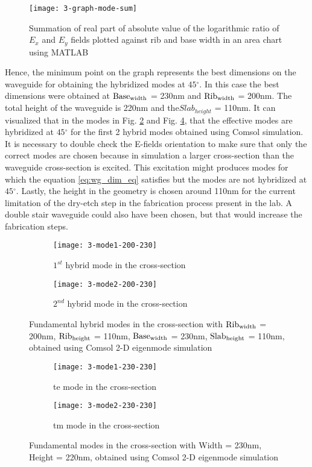 \documentclass[../report.tex]{subfiles}
\begin{document}
\begin{figure}[H] %
	\centering
	\texttt{[image: 3-graph-mode-sum]}
	\caption{Summation of real part of absolute value of the logarithmic ratio of $E_x$ and $E_y$ fields plotted against rib and base width in an area chart using MATLAB}
	\label{fig:3_graph_mode_sum}
\end{figure}  
\noindent Hence, the minimum point on the graph represents the best dimensions on the waveguide for obtaining the hybridized modes at $45{^\circ}$. In this case the best dimensions were obtained at $\mathrm{Base_{width}}$ = 230nm and $\mathrm{Rib_{width}}$ = 200nm. The total height of the waveguide is 220nm and the$Slab_{height}$ = 110nm. It can visualized that in the modes in Fig. \ref{fig:3_mode1_200_230} and Fig. \ref{fig:3_mode2_200_230}, that the effective modes are hybridized at $45{^\circ}$ for the first 2 hybrid modes obtained using Comsol simulation. It is necessary to double check the E-fields orientation to make sure that only the correct modes are chosen because in simulation a larger cross-section than the waveguide cross-section is excited. This excitation might produces modes for which the equation \ref{eq:wg_dim_eq} satisfies but the modes are not hybridized at $45{^\circ}$. Lastly, the height in the geometry is chosen around 110nm for the current limitation of the dry-etch step in the fabrication process present in the lab. A double stair waveguide could also have been chosen, but that would increase the fabrication steps.
\begin{figure}[H] %
	\begin{subfigure}[t]{0.45\textwidth}
		\texttt{[image: 3-mode1-200-230]}
		\caption{$1^{st}$ hybrid mode in the cross-section}
		\label{fig:3_mode1_200_230}
	\end{subfigure}
	\hfill
	\begin{subfigure}[t]{0.45\textwidth}
		\texttt{[image: 3-mode2-200-230]}
		\caption{$2^{nd}$ hybrid mode in the cross-section}
		\label{fig:3_mode2_200_230}
	\end{subfigure}
	\caption{Fundamental hybrid modes in the cross-section with $\mathrm{Rib_{width}}$ = 200nm, $\mathrm{Rib_{height}}$ = 110nm, $\mathrm{Base_{width}}$ = 230nm, $\mathrm{Slab_{height}}$ = 110nm, obtained using Comsol 2-D eigenmode simulation}
\end{figure}

\begin{figure}[H] %
	\begin{subfigure}[t]{0.45\textwidth}
		\texttt{[image: 3-mode1-230-230]}
		\caption{\gls{te} mode in the cross-section}
		\label{fig:3_mode1_230_230}
	\end{subfigure}
	\hfill
	\begin{subfigure}[t]{0.45\textwidth}
		\texttt{[image: 3-mode2-230-230]}
		\caption{\gls{tm} mode in the cross-section}
		\label{fig:3_mode2_230_230}
	\end{subfigure}
	\caption{Fundamental modes in the cross-section with Width = 230nm, Height = 220nm, obtained using Comsol 2-D eigenmode simulation}
\end{figure}
\end{document}
